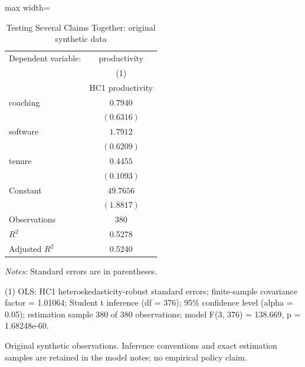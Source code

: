 \begin{table}[htbp]
\centering
\caption{Testing Several Claims Together: original synthetic data}
\label{tab:10-joint-tests}
\begingroup
\small
\setlength{\tabcolsep}{6pt}
\renewcommand{\arraystretch}{1.12}
\begin{adjustbox}{max width=\linewidth}
\begin{tabular}{@{}lc@{}}
\toprule
Dependent variable: & productivity \\
 & (1) \\
 & HC1 productivity \\
\midrule
coaching & $0.7940$ \\
 & $(0.6316)$ \\[0.35em]
software & $1.7912$ \\
 & $(0.6209)$ \\[0.35em]
tenure & $0.4455$ \\
 & $(0.1093)$ \\[0.35em]
Constant & $49.7656$ \\
 & $(1.8817)$ \\[0.35em]
\midrule
Observations & 380 \\
$R^{2}$ & 0.5278 \\
$\text{Adjusted }R^{2}$ & 0.5240 \\
\bottomrule
\end{tabular}
\end{adjustbox}
\par\smallskip
\begin{minipage}{\linewidth}
\footnotesize
\raggedright
\textit{Notes:} Standard errors are in parentheses.\par
(1) OLS: HC1 heteroskedasticity-robust standard errors; finite-sample covariance factor = 1.01064; Student t inference (df = 376); 95\% confidence level (alpha = 0.05); estimation sample 380 of 380 observations; model F(3, 376) = 138.669, p = 1.68248e-60.\par
Original synthetic observations. Inference conventions and exact estimation samples are retained in the model notes; no empirical policy claim.\par
\end{minipage}
\endgroup
\end{table}
